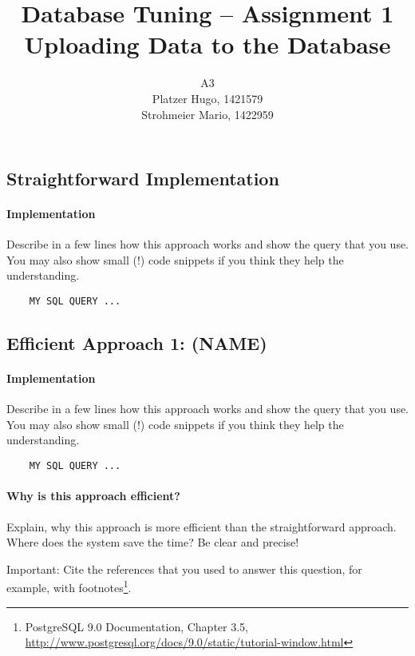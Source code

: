 \documentclass[11pt]{scrartcl}
\title{
  \textbf{\large Database Tuning -- Assignment 1}\\
  Uploading Data to the Database
}
\author{
 A3\\
 \large Platzer Hugo, 1421579 \\
 \large Strohmeier Mario, 1422959 \\
}
\begin{document}
\maketitle

\subsection*{Straightforward Implementation}

  \paragraph{Implementation}

  Describe in a few lines how this approach works and show the query
  that you use. You may also show small (!) code snippets if you think
  they help the understanding.

{\small
\begin{verbatim}
    MY SQL QUERY ...
\end{verbatim}
}

  \subsection*{Efficient Approach 1: (NAME)}

  \paragraph{Implementation}

  Describe in a few lines how this approach works and show the query
  that you use. You may also show small (!) code snippets if you think
  they help the understanding.


{\small
\begin{verbatim}
    MY SQL QUERY ...
\end{verbatim}
}

  \paragraph{Why is this approach efficient?}

  Explain, why this approach is more efficient than the
  straightforward approach. Where does the system save the time? Be
  clear and precise!
  
  Important: Cite the references that you used to answer this
  question, for example, with footnotes\footnote{PostgreSQL 9.0
    Documentation, Chapter 3.5,
    \url{http://www.postgresql.org/docs/9.0/static/tutorial-window.html}}.
\end{document}
